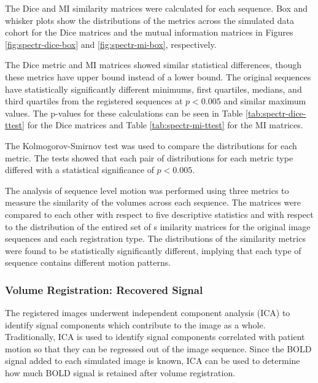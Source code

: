 The Dice and MI similarity matrices were calculated for each sequence. Box and whisker plots show the distributions of the metrics across the simulated data cohort for the Dice matrices and the mutual information matrices in Figures \ref{fig:spectr-dice-box} and \ref{fig:spectr-mi-box}, respectively.  

The Dice metric and MI matrices showed similar statistical differences, though these metrics have upper bound instead of a lower bound. The original sequences have statistically significantly different minimums, first quartiles, medians, and third quartiles from the registered sequences at $p < 0.005$ and similar maximum values. The p-values for these calculations can be seen in Table \ref{tab:spectr-dice-ttest} for the Dice matrices and Table \ref{tab:spectr-mi-ttest} for the MI matrices. 

The Kolmogorov-Smirnov test was used to compare the distributions for each metric. The tests showed that each pair of distributions for each metric type differed with a statistical significance of $p < 0.005$.

The analysis of sequence level motion was performed using three metrics to measure the similarity of the volumes across each sequence. The matrices were compared to each other with respect to five descriptive statistics and with respect to the distribution of the entired set of s imilarity matrices for the original image sequences and each registration type. The distributions of the similarity metrics were found to be statistically significantly different, implying that each type of sequence contains different motion patterns.


\subsubsection{Volume Registration: Recovered Signal}

The registered images underwent independent component analysis (ICA) to identify signal components which contribute to the image as a whole. Traditionally, ICA is used to identify signal components correlated with patient motion so that they can be regressed out of the image sequence. Since the BOLD signal added to each simulated image is known, ICA can be used to determine how much BOLD signal is retained after volume registration.

